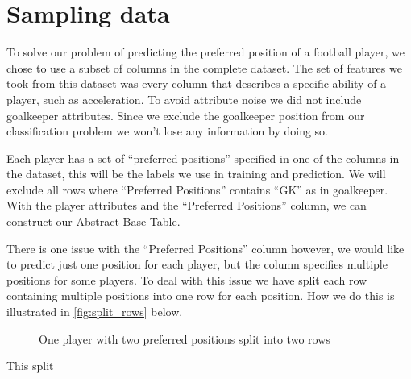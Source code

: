 \section{Sampling data}

To solve our problem of predicting the preferred position of a football player, we chose to use a subset of columns in the complete dataset. The set of features we took from this dataset was every column that describes a specific ability of a player, such as acceleration. To avoid attribute noise we did not include goalkeeper attributes. Since we exclude the goalkeeper position from our classification problem we won't lose any information by doing so. 
\par
Each player has a set of ``preferred positions'' specified in one of the columns in the dataset, this will be the labels we use in training and prediction. We will exclude all rows where ``Preferred Positions'' contains ``GK'' as in goalkeeper. With the player attributes and the ``Preferred Positions'' column, we can construct our Abstract Base Table.
\par
There is one issue with the ``Preferred Positions'' column however, we would like to predict just one position for each player, but the column specifies multiple positions for some players. To deal with this issue we have split each row containing multiple positions into one row for each position. How we do this is illustrated in \autoref{fig:split_rows} below.
\begin{figure}[!ht]
    \centering
    \caption{One player with two preferred positions split into two rows}\label{fig:split_rows}
\end{figure}
\par
This split 